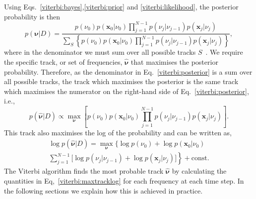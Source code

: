 Using Eqs.~\ref{viterbi:bayes},\ref{viterbi:prior} and
\ref{viterbi:likelihood}, the posterior probability is then
%
\begin{equation}
\label{viterbi:posterior}
    p({\bm \nu} | D) =
    \frac{p(\nu_0)p({\bm x_0} | \nu_0) \displaystyle\prod_{j=1}^{N-1}p(\nu_{j}
| \nu_{j-1})p({\bm x_j} | \nu_j)}{\displaystyle\sum_{S}
\left\{p(\nu_0)p({\bm x_0} | \nu_0)\displaystyle\prod_{j=1}^{N-1}p(\nu_{j} |
\nu_{j-1})p({\bm x_j} | \nu_j)\right\}} ,
\end{equation}
%
where in the denominator we must sum over all possible tracks
$S$~\cite{Slade2014}. We require the specific track, or set of frequencies, $\hat{\bm
\nu}$ that  maximises the posterior probability. Therefore, as the denominator in Eq.~\ref{viterbi:posterior} is a sum over all possible tracks, the track which maximises the posterior is the same track which
maximises the numerator  on the right-hand side of  Eq.~\ref{viterbi:posterior}, i.e.,
%
\begin{equation}
\label{viterbi:maxtrack}
  p(\hat{\bm \nu} | D) \propto \max_{\bm \nu}{\left[p(\nu_0)p({\bm x_0} |
\nu_0) \prod_{j=1}^{N-1}p(\nu_{j} |\nu_{j-1})p({\bm x_j} | \nu_j)\right]}.
\end{equation}
%
This track also maximises the log of the probability and can be written as,
%
\begin{equation}
\label{viterbi:maxtracklog}
\begin{split}
  \log p(\hat{\bm \nu} | D)  = \max_{{\bm \nu}}{\biggl\{ \log p(\nu_0) + \log p({\bm x_0} | \nu_0)  } \\
 \left. \sum_{j=1}^{N-1} \biggl[ \log p(\nu_{j} | \nu_{j-1}) + \log p({\bm x_j}
| \nu_j) \biggr] \right\} + \text{const}.
  \end{split}
\end{equation}
%
The Viterbi algorithm finds the most probable track $\hat{\bm \nu}$ by calculating the quantities in Eq,~\ref{viterbi:maxtracklog} for each frequency at each time step. In the following sections we explain how this is achieved in practice.

